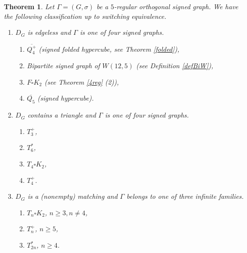 \documentclass[11pt]{article}
\theoremstyle{plain}
\newtheorem{theorem}{Theorem}[section]
\theoremstyle{definition}
\begin{document}
\begin{theorem} \label{Thm:Main_thm_technical}
    Let $\Gamma=(G,\sigma)$ be a $5$-regular orthogonal signed graph. We have the following classification up to switching equivalence.


    \begin{enumerate}
        \item $D_G$ is edgeless  and $\Gamma$ is one of four signed graphs.
        
        
        \begin{enumerate}
        
\item[$(1.1)$] $\overline{Q_4^+}$ (signed folded hypercube, see  Theorem  \ref{folded}),
\item[$(1.2)$] Bipartite signed graph of $W(12,5)$ (see Definition \ref{defBiW}),
\item[$(1.3)$] $F\square K_2$ (see Theorem \ref{4reg} (2)),
\item[$(1.4)$] $\overline{Q_5}$ (signed hypercube).
        
    \end{enumerate}
    \item $D_G$ contains a triangle and $\Gamma$ is one of four signed graphs. 

    \begin{enumerate}
        \item[$(2.1)$] $T_3^+$,
        \item[$(2.2)$] $T_6^{\ast}$,
        \item[$(2.3)$] $T_4\square K_2$,
        \item[$(2.4)$] $T^+_4$. 
        
 
        
    \end{enumerate}
        
    \item $D_G$ is a (nonempty) matching and $\Gamma$ belongs to one of three infinite families.
        \begin{enumerate}
            \item[$(3.1)$] $T_n\square K_2$, $n\geqslant3,n\neq 4$,
            \item[$(3.2)$] $T_n^+$, $n\geqslant 5$,
            \item[$(3.3)$] $T_{2n}^{\ast}$, $n\geqslant 4$.
        \end{enumerate}

        \end{enumerate}
\end{theorem}
\end{document}
